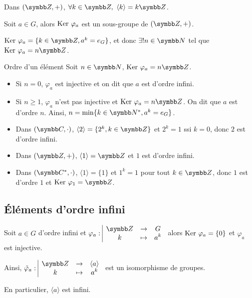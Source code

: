 \begin{exemple}
    Dans $(\Z, +)$, $\forall k \in \Z,~\langle k \rangle = k\Z$.
\end{exemple}

\begin{definition}{}{}
    Soit $a \in G$, alors $\operatorname{Ker} \, \varphi_a$ est un sous-groupe de $(\Z, +)$. 

    $\Ker \varphi_a = \{k \in \Z, a^k = e_G\}$, et donc 
    $\exists ! n \in \N$ tel que $\Ker \varphi_a = n \Z$. 
\end{definition}

\begin{definition}{Ordre d'un élément}{}
    Soit $n \in \N$, $\Ker \varphi_a = n\Z$. 

    \begin{itemize}
        \item Si $n = 0$, $\varphi_a$ est injective et on dit que $a$ est d'ordre infini.
        \item Si $n \geqslant 1$, $\varphi_a$ n'est pas injective et $\Ker \varphi_a = n \Z$.
        On dit que $a$ est d'ordre $n$. Ainsi, $n = \min \{k \in \N^*, a^k = e_G\}$.
    \end{itemize}
\end{definition}

\begin{exemple}
    \begin{itemize}
        \item Dans $(\C,\cdot)$, $\langle 2 \rangle = \{2^k, k \in \Z\}$ et
        $2^k = 1$ ssi $k = 0$, donc $2$ est d'ordre infini.

        \item Dans $(\Z, +)$, $\langle 1 \rangle = \Z$ et $1$ est d'ordre infini.

        \item Dans $(\C^*, \cdot)$, $\langle 1 \rangle = \{1\}$ et
        $1^k = 1$ pour tout $k \in \Z$, donc $1$ est d'ordre $1$ et 
        $\Ker \varphi_1 = \Z$.
    \end{itemize}
\end{exemple}

\subsection{Éléments d'ordre infini}

\begin{proposition}{}{}
    Soit $a \in G$ d'ordre infini et $\fonction {\varphi_a} \Z G k {a^k}$ 
    alors $\operatorname{Ker} \, \varphi_a = \{0\}$ et $\varphi_a$ est injective.

    Ainsi, $\fonction{\tilde \varphi_a} \Z {\langle a \rangle} k {a^k}$  est un 
    isomorphisme de groupes.

    En particulier, $\langle a \rangle$ est infini.
\end{proposition}

